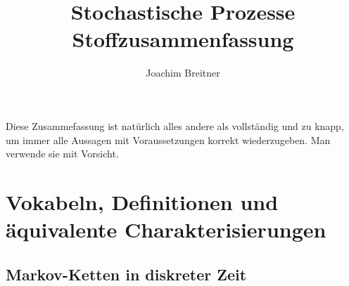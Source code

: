 \documentclass[a4paper,DIV15]{scrartcl}
\author{Joachim Breitner}
\title{Stochastische Prozesse\\Stoffzusammenfassung}
\begin{document}
\maketitle

Diese Zusammefassung ist natürlich alles andere als vollständig und zu knapp, um immer alle Aussagen mit Voraussetzungen korrekt wiederzugeben. Man verwende sie mit Vorsicht.

\section{Vokabeln, Definitionen und äquivalente Charakterisierungen}
\subsection{Markov-Ketten in diskreter Zeit}
\end{document}
